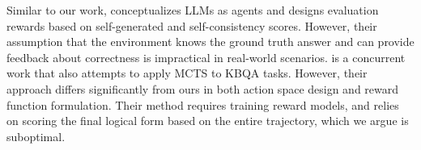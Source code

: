 Similar to our work, \citet{Zhou-Andy-ICML-2024-Language-Agent-Tree-Search} conceptualizes LLMs as agents and designs evaluation rewards based on self-generated and self-consistency scores.
However, their assumption that the environment knows the ground truth answer and can provide feedback about correctness is impractical in real-world scenarios.
\citet{Luo-Haoran-arXiv-2025-KBQA-o1} is a concurrent work that also attempts to apply MCTS to KBQA tasks. However, their approach differs significantly from ours in both action space design and reward function formulation. Their method requires training reward models, and relies on scoring the final logical form based on the entire trajectory, which we argue is suboptimal.

